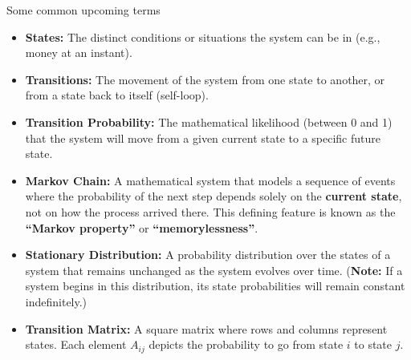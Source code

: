 \documentclass[aspectratio=169,10pt]{beamer}
\newif\ifkick \kickfalse
\newcommand{\kick}[1]{\def\thekicker{#1}\kicktrue}
\begin{document}
\begin{frame}[t]{Some common upcoming terms}
\kick{hook}
\small
\begin{itemize}
\item \textbf{States:} The distinct conditions or situations the system can be in (e.g., money at an instant).
\item \textbf{Transitions:} The movement of the system from one state to another, or from a state back to itself (self-loop).
\item \textbf{Transition Probability:} The mathematical likelihood (between 0 and 1) that the system will move from a given current state to a specific future state.
\item \textbf{Markov Chain:} A mathematical system that models a sequence of events where the probability of the next step depends solely on the \textbf{current state}, not on how the process arrived there. This defining feature is known as the \textbf{``Markov property''} or \textbf{``memorylessness''}.
\item \textbf{Stationary Distribution:} A probability distribution over the states of a system that remains unchanged as the system evolves over time.
(\textbf{Note:} If a system begins in this distribution, its state probabilities will remain constant indefinitely.)
\item \textbf{Transition Matrix:} A square matrix where rows and columns represent states. Each element $A_{ij}$ depicts the probability to go from state $i$ to state $j$.
\end{itemize}
\end{frame}
\end{document}
